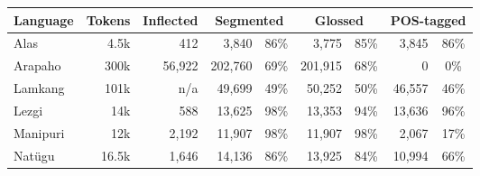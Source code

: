 \begin{table}
    \centering
    \begin{tabular}{l|r|r|rc|rc|rc}
         \textbf{Language} & \textbf{Tokens} & \textbf{Inflected} & \multicolumn{2}{c|}{\textbf{Segmented}} & \multicolumn{2}{c|}{\textbf{Glossed}} & \multicolumn{2}{c}{\textbf{POS-tagged}} \\
         \hline
         Alas & 4.5k  & 412 & 3,840 & 86\% & 3,775 & 85\% & 3,845  & 86\% \\
         \hline
         Arapaho & 300k &  56,922 & 202,760 & 69\%  & 201,915 & 68\% & 0  & 0\%  \\
         \hline
         Lamkang & 101k & n/a & 49,699 & 49\%  & 50,252 & 50\% & 46,557 & 46\% \\
         \hline
         Lezgi & 14k & 588 & 13,625  & 98\%  & 13,353  &  94\% & 13,636 & 96\%  \\
         \hline
         Manipuri & 12k  & 2,192 & 11,907 & 98\%  & 11,907 & 98\% & 2,067 & 17\% \\
         \hline
         Natügu & 16.5k & 1,646 & 14,136 & 86\%  & 13,925 &  84\% & 10,994 & 66\% \\

\end{tabular}
\end{table}
